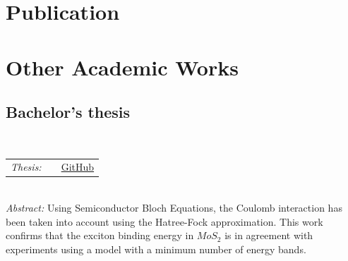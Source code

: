 \documentclass[letterpaper,11pt]{article}
\begin{document}
\section{Publication}
\vspace{3pt}
\section{Other Academic Works}
\subsection*{Bachelor's thesis}
\vspace{-5pt}
\hspace{0.5cm}{Calculation of The Linear-Absorption Spectrum of An Ideal Two-dimensional System of \(MoS_2\)}\\
\hspace{0.6cm}\begin{tabular}{l c r}
	\textit{Thesis: } & \hspace{0.2cm} \null& \href{https://github.com/VCDPhuong/Bachelor-Thesis/blob/37c1b5a46d3f06ed93adcf5fea8482b4f0515b45/20130008_VoChauDucPhuong.pdf}{\faGithub \hspace{.5pt}\color{blue}GitHub}\\
\end{tabular}\\
\hspace{0.6cm}\textit{Abstract: }Using Semiconductor Bloch Equations, the Coulomb interaction has been taken into account using the Hatree-Fock approximation. This work confirms that the exciton binding energy in \(MoS_2\) is in agreement with experiments using a model with a minimum number of energy bands.
\end{document}

